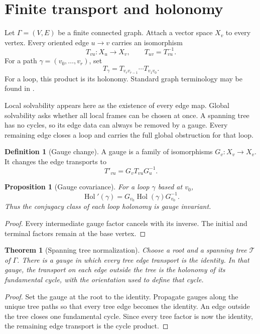 \documentclass{aomart}
\newtheorem{theorem}{Theorem}[section]
\newtheorem{proposition}[proposition]{Proposition}
\theoremstyle{definition}
\newtheorem{definition}[definition]{Definition}
\theoremstyle{remark}
\newcommand{\Tcal}{\mathcal T}
\newcommand{\Hol}{\operatorname{Hol}}
\begin{document}
\section{Finite transport and holonomy}\label{sec:finite_holonomy}

Let $\Gamma=(V,E)$ be a finite connected graph.  Attach a vector space $X_v$ to every vertex.  Every oriented edge $u\to v$ carries an isomorphism
\[
T_{vu}:X_u\longrightarrow X_v,
\qquad
T_{uv}=T_{vu}^{-1}.
\]
For a path $\gamma=(v_0,\ldots,v_r)$, set
\[
T_\gamma
=
T_{v_rv_{r-1}}\cdots T_{v_1v_0}.
\]
For a loop, this product is its holonomy.  Standard graph terminology may be found in \cite{GrossTucker1987}.

Local solvability appears here as the existence of every edge map.  Global solvability asks whether all local frames can be chosen at once.  A spanning tree has no cycles, so its edge data can always be removed by a gauge.  Every remaining edge closes a loop and carries the full global obstruction for that loop.

\begin{definition}[Gauge change]\label{def:gauge_change}
A gauge is a family of isomorphisms $G_v:X_v\to X_v$.  It changes the edge transports to
\[
T'_{vu}=G_vT_{vu}G_u^{-1}.
\]
\end{definition}

\begin{proposition}[Gauge covariance]\label{prop:gauge_covariance}
For a loop $\gamma$ based at $v_0$,
\[
\Hol'(\gamma)
=
G_{v_0}\Hol(\gamma)G_{v_0}^{-1}.
\]
Thus the conjugacy class of each loop holonomy is gauge invariant.
\end{proposition}

\begin{proof}
Every intermediate gauge factor cancels with its inverse.  The initial and terminal factors remain at the base vertex.
\end{proof}

\begin{theorem}[Spanning tree normalization]\label{thm:tree_normalization}
Choose a root and a spanning tree $\Tcal$ of $\Gamma$.  There is a gauge in which every tree edge transport is the identity.  In that gauge, the transport on each edge outside the tree is the holonomy of its fundamental cycle, with the orientation used to define that cycle.
\end{theorem}

\begin{proof}
Set the gauge at the root to the identity.  Propagate gauges along the unique tree paths so that every tree edge becomes the identity.  An edge outside the tree closes one fundamental cycle.  Since every tree factor is now the identity, the remaining edge transport is the cycle product.
\end{proof}
\end{document}
